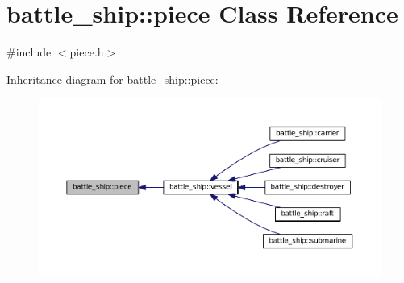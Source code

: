 \hypertarget{classbattle__ship_1_1piece}{}\section{battle\+\_\+ship\+:\+:piece Class Reference}
\label{classbattle__ship_1_1piece}


{\ttfamily \#include $<$piece.\+h$>$}



Inheritance diagram for battle\+\_\+ship\+:\+:piece\+:
\nopagebreak
\begin{figure}[H]
\begin{center}
\leavevmode
\includegraphics[width=350pt]{classbattle__ship_1_1piece__inherit__graph}
\end{center}
\end{figure}
